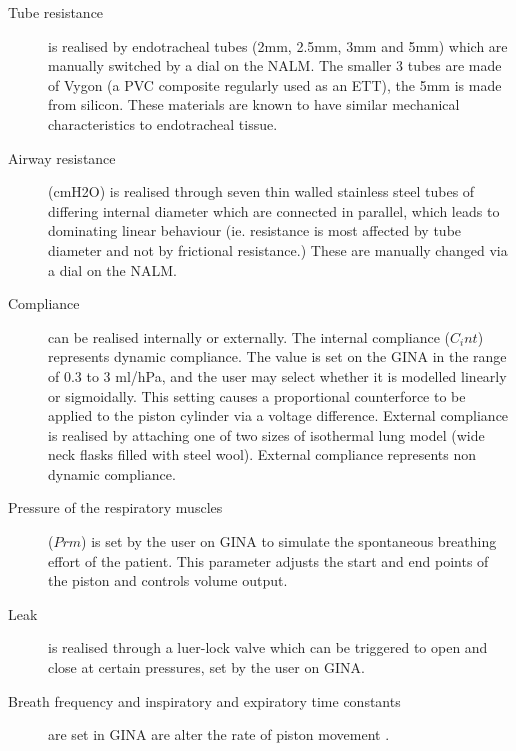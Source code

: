 \documentclass[12pt, openany, oneside]{book}
\begin{document}
\begin{description}
\item[Tube resistance] is realised by endotracheal tubes (2mm, 2.5mm, 3mm and 5mm) which are manually switched by a dial on the NALM. The smaller 3 tubes are made of Vygon (a PVC composite regularly used as an ETT), the 5mm is made from silicon. These materials are known to have similar mechanical characteristics to endotracheal tissue.
\item[Airway resistance] (cmH2O) is realised through seven thin walled stainless steel tubes of differing internal diameter which are connected in parallel, which leads to dominating linear behaviour (ie. resistance is most affected by tube diameter and not by frictional resistance.) These are manually changed via a dial on the NALM.
\item[Compliance] can be realised internally or externally. The internal compliance ($C_int$) represents dynamic compliance. The value is set on the GINA in the range of 0.3 to 3 ml/hPa, and the user may select whether it is modelled linearly or sigmoidally. This setting causes a proportional counterforce to be applied to the piston cylinder via a voltage difference. External compliance is realised by attaching one of two sizes of isothermal lung model (wide neck flasks filled with steel wool). External compliance represents non dynamic compliance.
\item[Pressure of the respiratory muscles] ($Prm$) is set by the user on GINA to simulate the spontaneous breathing effort of the patient. This parameter adjusts the start and end points of the piston and controls volume output.
\item[Leak] is realised through a luer-lock valve which can be triggered to open and close at certain pressures, set by the user on GINA.
\item[Breath frequency and inspiratory and expiratory time constants] are set in GINA are alter the rate of piston movement \citep{gina}.
\end{description}
\end{document}
